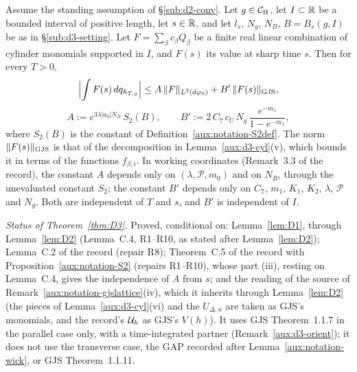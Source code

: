 \begin{dtheorem}\label{thm:D3}
Assume the standing assumption of \S\ref{sub:d2-conv}.  Let $g\in\mathcal{C}_{\mathrm H}$, let $I\subset\mathbb{R}$ be a
bounded interval of positive length, let $s\in\mathbb{R}$, and let $l_s$, $N_g$, $N_B$, $B=B_s(g,I)$ be
as in \S\ref{sub:d3-setting}.  Let $F=\sum_\beta c_\beta Q_\beta$ be a finite real linear
combination of cylinder monomials supported in $I$, and $F(s)$ its value at sharp time $s$.
Then for every $T>0$,
\[
 \Bigl|\int F(s)\,dq_{h_{T,g}}\Bigr|\le A\,\|F\|_{L^2(d\varphi_0)}+B'\,\lVert F(s)\rVert_{\mathrm{GJS}} ,
\]
\[
 A:=e^{3\lambda|a_0|N_B}\,S_2(B),\qquad
 B':=2\,C_7\,c_U\,N_g\,\frac{e^{-m_1}}{1-e^{-m_1}} ,
\]
where $S_2(B)$ is the constant of Definition~\ref{aux:notation-S2def}.  The norm $\lVert F(s)\rVert_{\mathrm{GJS}}$
is that of the decomposition in Lemma~\ref{aux:d3-cyl}(v), which bounds it in terms of the
functions $f_{\beta,i}$.  In working coordinates (Remark~3.3 of the record), the constant $A$
depends only on $(\lambda,\mathscr P,m_0)$ and on $N_B$, through the unevaluated constant $S_2$;
the constant $B'$ depends only on $C_7$, $m_1$, $K_1$, $K_2$, $\lambda$, $\mathscr P$ and $N_g$.
Both are independent of $T$ and $s$, and $B'$ is independent of $I$.
\end{dtheorem}

\emph{Status of Theorem~\ref{thm:D3}.}  Proved, conditional on: Lemma~\ref{lem:D1}, through
Lemma~\ref{lem:D2} (Lemma~C.4, R1--R10, as stated after Lemma~\ref{lem:D2});
Lemma~C.2 of the record (repair R8); Theorem~C.5 of the record with
Proposition~\ref{aux:notation-S2} (repairs R1--R10), whose part (iii), resting on Lemma~C.4,
gives the independence of $A$ from $s$; and the reading of the source of
Remark~\ref{aux:notation-gjslattice}(iv), which it inherits through Lemma~\ref{lem:D2} (the
pieces of Lemma~\ref{aux:d3-cyl}(vi) and the $U_{\Delta,n}$ are taken as GJS's monomials, and the
record's $\mathcal U_h$ as GJS's $V(h)$).  It uses GJS Theorem~1.1.7 in the parallel case only, with
a time-integrated partner (Remark~\ref{aux:d3-orient}); it does not use the transverse case, the
GAP recorded after Lemma~\ref{aux:notation-wick}, or GJS Theorem~1.1.11.

